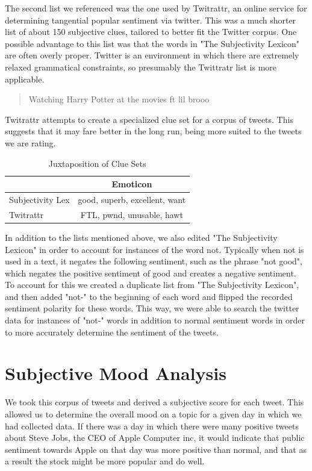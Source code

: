 \documentclass[11pt]{article}
\begin{document}
The second list we referenced was the one used by Twitrattr, an online service for determining tangential popular sentiment via twitter. This was a much shorter list of about 150 subjective clues, tailored to better fit the Twitter corpus. One possible advantage to this list was that the words in "The Subjectivity Lexicon" are often overly proper. Twitter is an environment in which there are extremely relaxed grammatical constraints, so presumably the Twittratr list is more applicable.

\begin{quote}
Watching Harry Potter at the movies ft lil brooo
\end{quote}
Twitrattr attempts to create a specialized clue set for a corpus of tweets. This suggests that it may fare better in the long run, being more suited to the tweets we are rating.

\begin{table}[ht!]
\centering
\caption{Juxtaposition of Clue Sets}
\begin{tabular}{|l|c|}
\hline
 & Emoticon \\
\hline
Subjectivity Lex& good, superb, excellent, want\\
\hline
Twitrattr & FTL, pwnd, unusable, hawt\\
\hline
\end{tabular}
\end{table}

In addition to the lists mentioned above, we also edited "The Subjectivity Lexicon" in order to account for instances of the word not.  Typically when not is used in a text, it negates the following sentiment, such as the phrase "not good", which negates the positive sentiment of good and creates a negative sentiment. To account for this we created a duplicate list from "The Subjectivity Lexicon", and then added "not-" to the beginning of each word and flipped the recorded sentiment polarity for these words.  This way, we were able to search the twitter data for instances of "not-" words in addition to normal sentiment words in order to more accurately determine the sentiment of the tweets.

\section{Subjective Mood Analysis}
We took this corpus of tweets and derived a subjective score for each tweet. This allowed us to determine the overall mood on a topic for a given day in which we had collected data. If there was a day in which there were many positive tweets about Steve Jobs, the CEO of Apple Computer inc, it would indicate that public sentiment towards Apple on that day was more positive than normal, and that as a result the stock might be more popular and do well.
\end{document}
